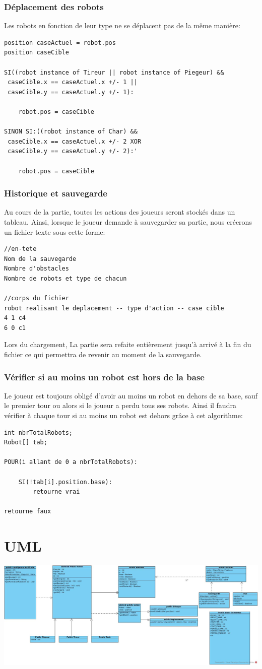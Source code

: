 \documentclass[12pt]{article}
\begin{document}
\section{Déplacement des robots}
Les robots en fonction de leur type ne se déplacent pas de la même manière:
\begin{lstlisting}
position caseActuel = robot.pos
position caseCible

SI((robot instance of Tireur || robot instance of Piegeur) &&
 caseCible.x == caseActuel.x +/- 1 ||
 caseCible.y == caseActuel.y +/- 1):
	 
	robot.pos = caseCible

SINON SI:((robot instance of Char) && 
 caseCible.x == caseActuel.x +/- 2 XOR
 caseCible.y == caseActuel.y +/- 2):'
 
	robot.pos = caseCible
\end{lstlisting}

\section{Historique et sauvegarde}
Au cours de la partie, toutes les actions des joueurs seront stockés dans un tableau.
Ainsi, lorsque le joueur demande à sauvegarder sa partie, nous créerons un fichier texte sous cette forme:
\begin{lstlisting}
//en-tete
Nom de la sauvegarde
Nombre d'obstacles
Nombre de robots et type de chacun

//corps du fichier
robot realisant le deplacement -- type d'action -- case cible
4 1 c4
6 0 c1
\end{lstlisting}
Lors du chargement, La partie sera refaite entièrement jusqu'à arrivé à la fin du fichier ce qui permettra de revenir au moment de la sauvegarde.

\newpage
\section{Vérifier si au moins un robot est hors de la base}
Le joueur est toujours obligé d'avoir au moins un robot en dehors de sa base, sauf le premier tour ou alors si le joueur a perdu tous ses robots. Ainsi il faudra vérifier à chaque tour si au moins un robot est dehors grâce à cet algorithme:

\begin{lstlisting}
int nbrTotalRobots;
Robot[] tab;

POUR(i allant de 0 a nbrTotalRobots):

	SI(!tab[i].position.base):
		retourne vrai

retourne faux
\end{lstlisting}


\part*{UML}

\includegraphics[scale=0.5, angle = -90]{img/uml.jpg}
\end{document}
